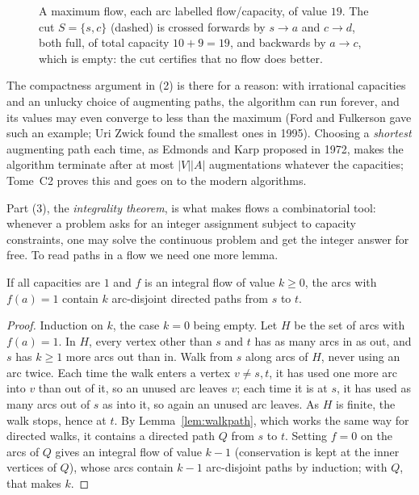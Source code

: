 \begin{figure}[ht]
\centering
{}
\caption{A maximum flow, each arc labelled flow/capacity, of value $19$. The cut $S=\{s,c\}$ (dashed) is crossed forwards by
$s\to a$ and $c\to d$, both full, of total capacity $10+9=19$, and backwards by $a\to c$, which is empty: the cut certifies that no
flow does better.}
\label{fig:flow}
\end{figure}

The compactness argument in (2) is there for a reason: with irrational capacities and an unlucky choice of augmenting paths,
the algorithm can run forever, and its values may even converge to less than the maximum (Ford and Fulkerson gave such an
example; Uri Zwick found the smallest ones in 1995). Choosing a \emph{shortest} augmenting path each time, as Edmonds and Karp proposed
in 1972, makes the algorithm terminate after at most $|V||A|$ augmentations whatever the capacities; Tome~C2 proves this and
goes on to the modern algorithms.

Part (3), the \emph{integrality theorem}, is what makes flows a combinatorial tool: whenever a problem asks for an integer
assignment subject to capacity constraints, one may solve the continuous problem and get the integer answer for free. To read
paths in a flow we need one more lemma.

\begin{lemma}\label{lem:decomp}
If all capacities are $1$ and $f$ is an integral flow of value $k\ge0$, the arcs with $f(a)=1$ contain $k$ arc-disjoint directed paths from $s$ to $t$.
\end{lemma}
\begin{proof}
Induction on $k$, the case $k=0$ being empty. Let $H$ be the set of arcs with $f(a)=1$. In $H$, every vertex other than $s$ and $t$ has as
many arcs in as out, and $s$ has $k\ge1$ more arcs out than in. Walk from $s$ along arcs of $H$, never using an arc twice. Each time the walk enters a
vertex $v\ne s,t$, it has used one more arc into $v$ than out of it, so an unused arc leaves $v$; each time it is at $s$, it has used as many arcs out of $s$ as
into it, so again an unused arc leaves. As $H$ is finite, the walk stops, hence at $t$. By Lemma~\ref{lem:walkpath}, which works
the same way for directed walks, it contains a directed path $Q$ from $s$ to $t$. Setting $f=0$ on the arcs of $Q$ gives an integral flow of
value $k-1$ (conservation is kept at the inner vertices of $Q$), whose arcs contain $k-1$ arc-disjoint paths by induction; with $Q$, that makes $k$.
\end{proof}

